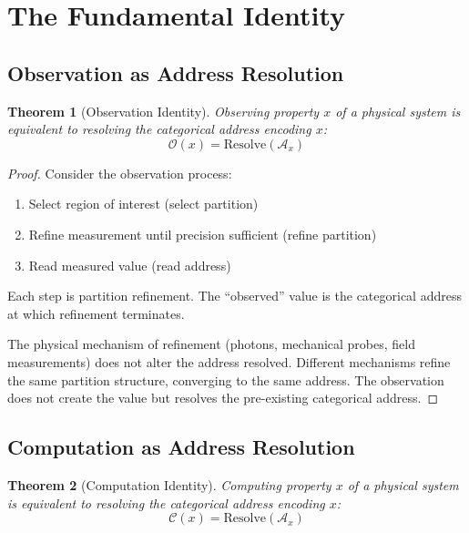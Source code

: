 \documentclass[10pt,twocolumn]{article}
\theoremstyle{plain}
\newtheorem{theorem}{Theorem}[section]
\theoremstyle{definition}
\theoremstyle{remark}
\newcommand{\Obs}{\mathcal{O}}
\newcommand{\Comp}{\mathcal{C}}
\begin{document}
\section{The Fundamental Identity}
\label{sec:identity}

\subsection{Observation as Address Resolution}

\begin{theorem}[Observation Identity]
\label{thm:obs_identity}
Observing property $x$ of a physical system is equivalent to resolving the categorical address encoding $x$:
\begin{equation}
\Obs(x) = \mathrm{Resolve}(\mathcal{A}_x)
\label{eq:obs_resolve}
\end{equation}
\end{theorem}

\begin{proof}
Consider the observation process:
\begin{enumerate}[label=(\roman*)]
\item Select region of interest (select partition)
\item Refine measurement until precision sufficient (refine partition)
\item Read measured value (read address)
\end{enumerate}
Each step is partition refinement. The ``observed'' value is the categorical address at which refinement terminates.

The physical mechanism of refinement (photons, mechanical probes, field measurements) does not alter the address resolved. Different mechanisms refine the same partition structure, converging to the same address. The observation does not create the value but resolves the pre-existing categorical address.
\end{proof}

\subsection{Computation as Address Resolution}

\begin{theorem}[Computation Identity]
\label{thm:comp_identity}
Computing property $x$ of a physical system is equivalent to resolving the categorical address encoding $x$:
\begin{equation}
\Comp(x) = \mathrm{Resolve}(\mathcal{A}_x)
\label{eq:comp_resolve}
\end{equation}
\end{theorem}
\end{document}
